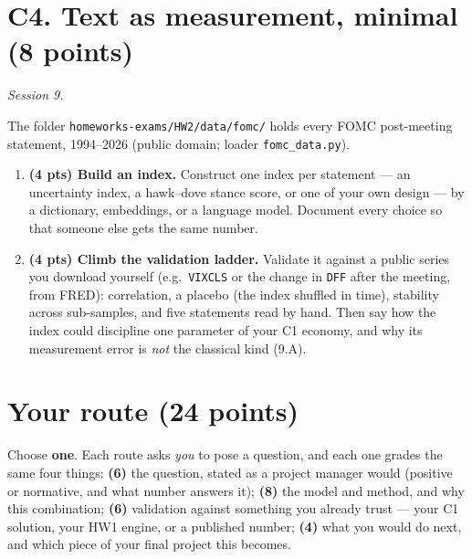 \documentclass[11pt]{article}
\newif\ifsolutions \solutionsfalse
\newcommand{\solution}[1]{\ifsolutions\medskip
  {\color{blue!45!black}\textbf{Solution.} #1}\medskip\fi}
\begin{document}
\solution{\keyDone}

\section*{C4. Text as measurement, minimal (8 points)}
\emph{Session 9.}

The folder \texttt{homeworks-exams/HW2/data/fomc/} holds every FOMC post-meeting statement,
1994--2026 (public domain; loader \texttt{fomc\_data.py}).
\begin{enumerate}[label=(\alph*), leftmargin=*]
  \item \textbf{(4 pts) Build an index.} Construct one index per statement --- an uncertainty index,
        a hawk--dove stance score, or one of your own design --- by a dictionary, embeddings, or a
        language model. Document every choice so that someone else gets the same number.
  \item \textbf{(4 pts) Climb the validation ladder.} Validate it against a public series you download
        yourself (e.g.\ \texttt{VIXCLS} or the change in \texttt{DFF} after the meeting, from FRED):
        correlation, a placebo (the index shuffled in time), stability across sub-samples, and five
        statements read by hand. Then say how the index could discipline one parameter of your C1
        economy, and why its measurement error is \emph{not} the classical kind (9.A).
\end{enumerate}

\solution{\keyDtwo}

\section*{Your route (24 points)}

Choose \textbf{one}. Each route asks \emph{you} to pose a question, and each one grades the same
four things: \textbf{(6)} the question, stated as a project manager would (positive or normative,
and what number answers it); \textbf{(8)} the model and method, and why this combination; \textbf{(6)}
validation against something you already trust --- your C1 solution, your HW1 engine, or a
published number; \textbf{(4)} what you would do next, and which piece of your final project this
becomes.
\end{document}
